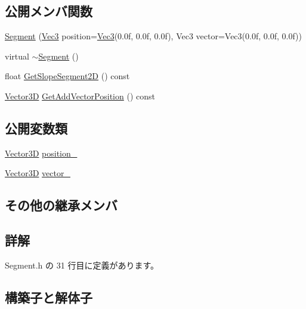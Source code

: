\subsection*{公開メンバ関数}
\begin{DoxyCompactItemize}
\item 
\mbox{\hyperlink{class_segment_af491ed36fc8467aaaf503ba1053b85fd}{Segment}} (\mbox{\hyperlink{_vector3_d_8h_ab16f59e4393f29a01ec8b9bbbabbe65d}{Vec3}} position=\mbox{\hyperlink{_vector3_d_8h_ab16f59e4393f29a01ec8b9bbbabbe65d}{Vec3}}(0.\+0f, 0.\+0f, 0.\+0f), Vec3 vector=\+Vec3(0.\+0f, 0.\+0f, 0.\+0f))
\item 
virtual \mbox{\hyperlink{class_segment_a76b45a453304f1f485e3bc2fcad58b59}{$\sim$\+Segment}} ()
\item 
float \mbox{\hyperlink{class_segment_a889d62f6d4c10701464726da706ae043}{Get\+Slope\+Segment2D}} () const
\item 
\mbox{\hyperlink{class_vector3_d}{Vector3D}} \mbox{\hyperlink{class_segment_a4223e990a42cc9e487ef51b82e63e777}{Get\+Add\+Vector\+Position}} () const
\end{DoxyCompactItemize}
\subsection*{公開変数類}
\begin{DoxyCompactItemize}
\item 
\mbox{\hyperlink{class_vector3_d}{Vector3D}} \mbox{\hyperlink{class_segment_aee447b161d940d22e9aa222091789e08}{position\+\_\+}}
\item 
\mbox{\hyperlink{class_vector3_d}{Vector3D}} \mbox{\hyperlink{class_segment_a6834b88ecae688f0fc5b4ed95fab824b}{vector\+\_\+}}
\end{DoxyCompactItemize}
\subsection*{その他の継承メンバ}


\subsection{詳解}


 Segment.\+h の 31 行目に定義があります。



\subsection{構築子と解体子}
\mbox{\label{class_segment_af491ed36fc8467aaaf503ba1053b85fd}} 
